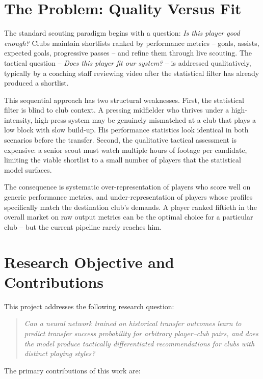 \documentclass[12pt, a4paper, oneside]{report}
\begin{document}
\section{The Problem: Quality Versus Fit}

The standard scouting paradigm begins with a question: \textit{Is this player good enough?} Clubs maintain shortlists ranked by performance metrics -- goals, assists, expected goals, progressive passes -- and refine them through live scouting. The tactical question -- \textit{Does this player fit our system?} -- is addressed qualitatively, typically by a coaching staff reviewing video after the statistical filter has already produced a shortlist.

This sequential approach has two structural weaknesses. First, the statistical filter is blind to club context. A pressing midfielder who thrives under a high-intensity, high-press system may be genuinely mismatched at a club that plays a low block with slow build-up. His performance statistics look identical in both scenarios before the transfer. Second, the qualitative tactical assessment is expensive: a senior scout must watch multiple hours of footage per candidate, limiting the viable shortlist to a small number of players that the statistical model surfaces.

The consequence is systematic over-representation of players who score well on generic performance metrics, and under-representation of players whose profiles specifically match the destination club's demands. A player ranked fiftieth in the overall market on raw output metrics can be the optimal choice for a particular club -- but the current pipeline rarely reaches him.

\section{Research Objective and Contributions}

This project addresses the following research question:

\begin{quote}
\textit{Can a neural network trained on historical transfer outcomes learn to predict transfer success probability for arbitrary player--club pairs, and does the model produce tactically differentiated recommendations for clubs with distinct playing styles?}
\end{quote}

The primary contributions of this work are:
\end{document}
